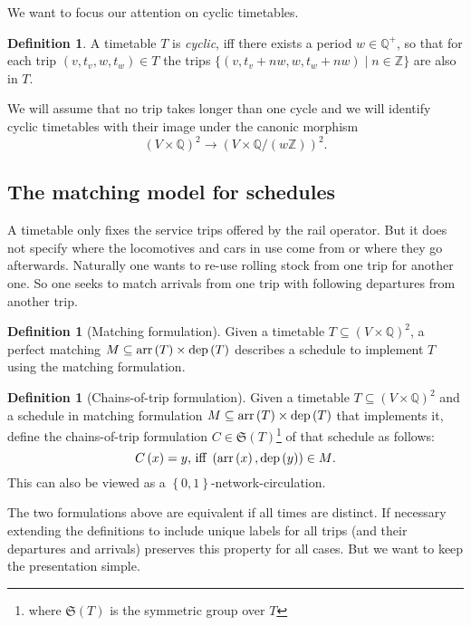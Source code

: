 \documentclass[a4paper]{amsart}
\theoremstyle{definition}
\newtheorem{defn}[theorem]{Definition}
\theoremstyle{remark}
\newcommand{\integers}{\ensuremath{\mathbb{Z}}}
\newcommand{\rationals}{\ensuremath{\mathbb{Q}}}
\newcommand{\Sym}{\ensuremath{\mathfrak{S}}}
\newcommand{\lr}[1]{\ensuremath{\left( #1 \right)}}
\newcommand{\lrM}[1]{\ensuremath{\left\{ #1 \right\}}}
\begin{document}
We want to focus our attention on cyclic timetables.
\begin{defn} A timetable \(T\) is \label{cyclic} \textit{cyclic}, iff
  there exists a period \(w \in \rationals^+\), so that for each trip
  \((v, t_v, w, t_w) \in T\) the trips \(\{(v, t_v+n w, w, t_w +n w)
  \mid n \in \mathbb{Z}\}\) are also in \(T\).
\end{defn}
We will assume that no trip takes longer than one cycle and
we will identify cyclic timetables with their image under the canonic
morphism
\[\left(V \times \rationals\right)^2 \to
\left(V \times \rationals/{\left(w \integers\right)}\right)^2\text{.}\]

\subsection{The matching model for schedules}

A timetable only fixes the service trips offered by the rail operator.  But
it does not specify where the locomotives and cars in use come from or
where they go afterwards.  Naturally one wants to re-use rolling stock
from one trip for another one.  So one seeks to match arrivals from
one trip with following departures from another trip.

\begin{defn}[Matching formulation]
  Given a timetable \(T \subseteq \left(V \times
    \rationals\right)^2\), a perfect matching \(M \subseteq \arr \lr{T} \times \dep \lr{T}\)
  describes a schedule to implement \(T\) using the matching formulation.
\end{defn}
\begin{defn}[Chains-of-trip formulation]
  Given a timetable \(T \subseteq \left(V \times \rationals\right)^2\)
  and a schedule in matching formulation \(M \subseteq \arr \lr{T}
  \times \dep \lr{T}\) that implements it,
  define the chains-of-trip formulation \(C \in \Sym\lr{T}\)\footnote{where \(\Sym \lr{T}\) is the symmetric group over \(T\)} of that schedule as follows:
  \[C \lr{x} = y\text{, iff }\lr{\arr\lr{x},\dep\lr{y}} \in M\text{.}\]
  This can also be viewed as a \(\lrM{0,1}\)-network-circulation.
\end{defn}

The two formulations above are equivalent if all times are distinct.
If necessary extending the definitions to include unique labels for
all trips (and their departures and arrivals) preserves this property
for all cases.  But we want to keep the presentation simple.
\end{document}
